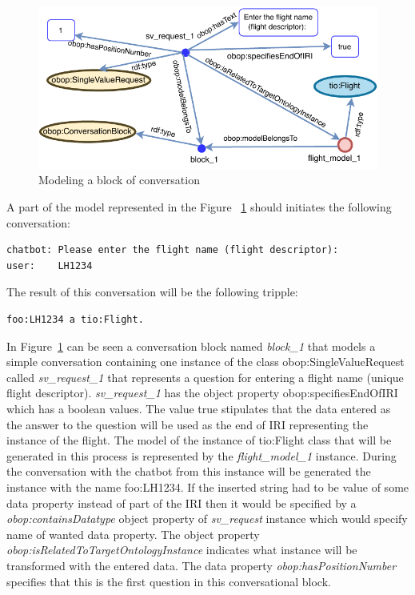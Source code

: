 \documentclass[runningheads]{llncs}
\begin{document}
\begin{figure}[H]
  \centering
  \includegraphics[width=\linewidth]{img/conversation_block}
  \caption{Modeling a block of conversation}
  \label{fig:conv_block}
\end{figure}


A part of the model represented in the Figure ~\ref{fig:conv_block} should initiates the following conversation:
\begin{lstlisting}[basicstyle=\small,  xleftmargin=0.7cm ]
chatbot: Please enter the flight name (flight descriptor):
user:    LH1234
\end{lstlisting}
The result of this conversation will be the following tripple:
\begin{lstlisting}[basicstyle=\small,  xleftmargin=0.7cm ]
foo:LH1234 a tio:Flight. 
\end{lstlisting}
In Figure~\ref{fig:conv_block} can be seen a conversation block named \textit{block\_1} that  models a simple conversation containing one instance of the class obop:SingleValueRequest called \textit{sv\_request\_1} that represents a question for entering a flight name (unique flight descriptor). \textit{sv\_request\_1} has the object property obop:specifiesEndOfIRI which has a boolean values. The value true stipulates that the data entered as the answer to the question will be used as the end of IRI representing the instance of the flight. The model of the instance of tio:Flight class that will be generated in this process is represented by the \textit{flight\_model\_1} instance. During the conversation with the chatbot from this instance will be generated the instance with the name foo:LH1234. If the inserted string had to be value of some data property instead of part of the IRI then it would be specified by a \textit{obop:containsDatatype} object property of \textit{sv\_request} instance which would specify name of wanted data property. The object property \textit{obop:isRelatedToTargetOntologyInstance} indicates what instance will be transformed with the entered data. The data property \textit{obop:hasPositionNumber} specifies that this is the first question in this conversational block.  
\end{document}
